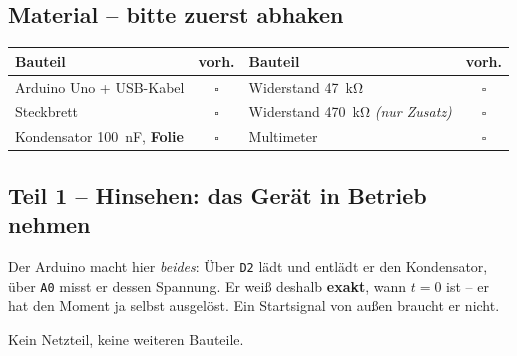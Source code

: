 \documentclass[a4paper,12pt]{scrartcl}
\begin{document}
\vspace{7pt}

\subsection*{Material -- bitte zuerst abhaken}

\begin{center}
\begin{tabular}{p{6.3cm} c p{6.3cm} c}
\toprule
\textbf{Bauteil} & \textbf{vorh.} & \textbf{Bauteil} & \textbf{vorh.} \\
\midrule
Arduino Uno + USB-Kabel & $\square$ & Widerstand \SI{47}{\kilo\ohm} & $\square$ \\
Steckbrett & $\square$ & Widerstand \SI{470}{\kilo\ohm} \emph{(nur Zusatz)} & $\square$ \\
Kondensator \SI{100}{\nano\farad}, \textbf{Folie} & $\square$ & Multimeter & $\square$ \\
\bottomrule
\end{tabular}
\end{center}

\subsection*{Teil 1 -- Hinsehen: das Gerät in Betrieb nehmen}

\noindent
\begin{minipage}[c]{9.0cm}
\begin{center}
\end{center}
\end{minipage}%
\hfill
\begin{minipage}[c]{7.6cm}
\small Der Arduino macht hier \emph{beides}: Über \texttt{D2} lädt und entlädt er den Kondensator,
über \texttt{A0} misst er dessen Spannung. Er weiß deshalb \textbf{exakt}, wann $t=0$ ist --
er hat den Moment ja selbst ausgelöst. Ein Startsignal von außen braucht er nicht.

\smallskip
Kein Netzteil, keine weiteren Bauteile.
\end{minipage}
\end{document}
